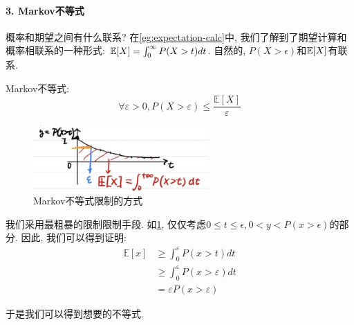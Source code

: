 \paragraph{3. Markov不等式} 概率和期望之间有什么联系? 在\cref{eg:expectation-calc}中, 我们了解到了期望计算和概率相联系的一种形式: $\mathbb E[X]=\int_0^\infty P(X>t) dt$. 自然的, $P(X>\epsilon)$和$\mathbb E[X]$有联系. 

\begin{theorem}
    Markov不等式: 
    $$
\forall \varepsilon>0, P(X>\varepsilon) \leq \frac{\mathbb{E}[X]}{\varepsilon}
$$
\end{theorem}

\begin{figure}
    \includegraphics[width=0.6\textwidth]{fig/ch4/markov-ineq.jpg} 
    \caption{Markov不等式限制的方式}
    \label{fig:markov-ineq}
\end{figure}

我们采用最粗暴的限制限制手段. 如\cref{fig:markov-ineq}, 仅仅考虑$0\leq t\leq \epsilon, 0<y<P(x>\epsilon)$的部分. 因此, 我们可以得到证明: 
$$
\begin{aligned}
\mathbb{E}[x] & \geqslant \int_0^{\varepsilon} P(x>t) d t \\
& \geqslant \int_0^{\varepsilon} P(x>\varepsilon) d t \\
& =\varepsilon P(x>\varepsilon)
\end{aligned}
$$

于是我们可以得到想要的不等式. 